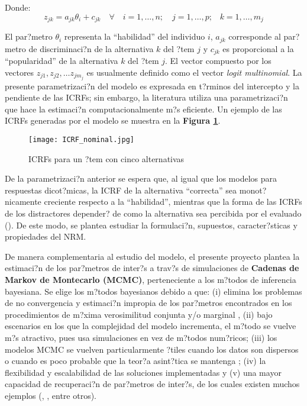 Donde:
\begin{equation*}
z_{jk} = a_{jk}\theta_i + c_{jk} \quad \forall \quad i = 1, \dots, n; \quad j = 1, \dots, p \text{;} \quad k = 1, \dots, m_j
\end{equation*}

El par?metro $\theta_i$ representa la ``habilidad'' del individuo $i$, $a_{jk}$ corresponde al par?metro de discriminaci?n de la alternativa $k$ del ?tem $j$ y $c_{jk}$ es proporcional a la ``popularidad'' de la alternativa $k$ del ?tem $j$. El vector compuesto por los vectores $z_{j1}, z_{j2}, \dots z_{j m_j}$ es usualmente definido como el vector \textit{logit multinomial}. La presente parametrizaci?n del modelo es expresada en t?rminos del intercepto y la pendiente de las ICRFs; sin embargo, la literatura utiliza una parametrizaci?n que hace la estimaci?n computacionalmente m?s eficiente.  Un ejemplo de las ICRFs generadas por el modelo se muestra en la \textbf{Figura \ref{fig:ICRF_nominal}}.
\begin{figure}[h]
	\centering
	\texttt{[image: ICRF\_nominal.jpg]}
	\caption{ICRFs para un ?tem con cinco alternativas}
	\label{fig:ICRF_nominal}
\end{figure}

De la parametrizaci?n anterior se espera que, al igual que los modelos para respuestas dicot?micas, la ICRF de la alternativa ``correcta'' sea monot?nicamente creciente respecto a la ``habilidad'', mientras que la forma de las ICRFs de los distractores depender? de como la alternativa sea percibida por el evaluado (\citealp{Ham_Swam1991}). De este modo, se plantea estudiar la formulaci?n, supuestos, caracter?sticas y propiedades del NRM.

De manera complementaria al estudio del modelo, el presente proyecto plantea la estimaci?n de los par?metros de inter?s a trav?s de simulaciones de \textbf{Cadenas de Markov de Montecarlo (MCMC)}, perteneciente a los m?todos de inferencia bayesiana. Se elige los m?todos bayesianos debido a que: (i) elimina los problemas de no convergencia y estimaci?n impropia de los par?metros encontrados en los procedimientos de m?xima verosimilitud conjunta y/o marginal \citep{Ham_Swam_Rog1991}, (ii) bajo escenarios en los que la complejidad del modelo incrementa, el m?todo se vuelve m?s atractivo, pues usa simulaciones en vez de m?todos num?ricos; (iii) los modelos MCMC se vuelven particularmente ?tiles cuando los datos son dispersos o cuando es poco probable que la teor?a asint?tica se mantenga \citep{Fox2010}; (iv) la flexibilidad y escalabilidad de las soluciones implementadas y (v) una mayor capacidad de recuperaci?n de par?metros de inter?s, de los cuales existen muchos ejemplos (\citealp{Hsi_Proc_Hou_Teo2010}, \citealp{Tarazona2013}, entre otros).

